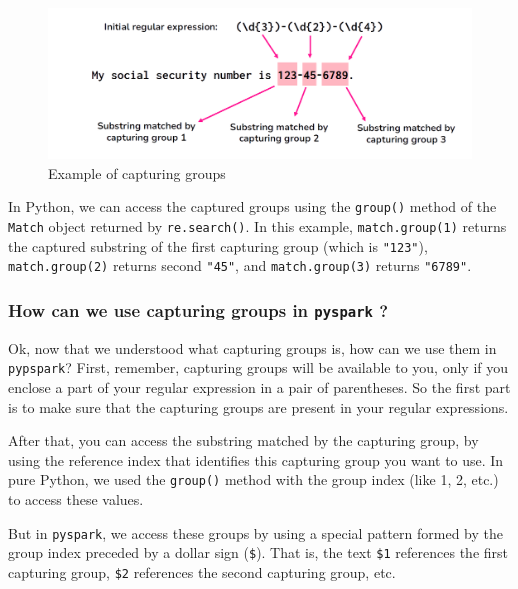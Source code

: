 \documentclass[
  11pt,
  letterpaper,
  DIV=11,
  numbers=noendperiod]{scrreprt}
\begin{document}
\begin{figure}

{\centering \includegraphics{Chapters/./../Figures/substring-capturing-groups.png}

}

\caption{\label{fig-substring-capturing-groups}Example of capturing
groups}

\end{figure}

In Python, we can access the captured groups using the \texttt{group()}
method of the \texttt{Match} object returned by \texttt{re.search()}. In
this example, \texttt{match.group(1)} returns the captured substring of
the first capturing group (which is \texttt{"123"}),
\texttt{match.group(2)} returns second \texttt{"45"}, and
\texttt{match.group(3)} returns \texttt{"6789"}.

\hypertarget{how-can-we-use-capturing-groups-in-pyspark}{%
\subsubsection{\texorpdfstring{How can we use capturing groups in
\texttt{pyspark}
?}{How can we use capturing groups in pyspark ?}}\label{how-can-we-use-capturing-groups-in-pyspark}}

Ok, now that we understood what capturing groups is, how can we use them
in \texttt{pypspark}? First, remember, capturing groups will be
available to you, only if you enclose a part of your regular expression
in a pair of parentheses. So the first part is to make sure that the
capturing groups are present in your regular expressions.

After that, you can access the substring matched by the capturing group,
by using the reference index that identifies this capturing group you
want to use. In pure Python, we used the \texttt{group()} method with
the group index (like 1, 2, etc.) to access these values.

But in \texttt{pyspark}, we access these groups by using a special
pattern formed by the group index preceded by a dollar sign
(\texttt{\$}). That is, the text \texttt{\$1} references the first
capturing group, \texttt{\$2} references the second capturing group,
etc.
\end{document}
